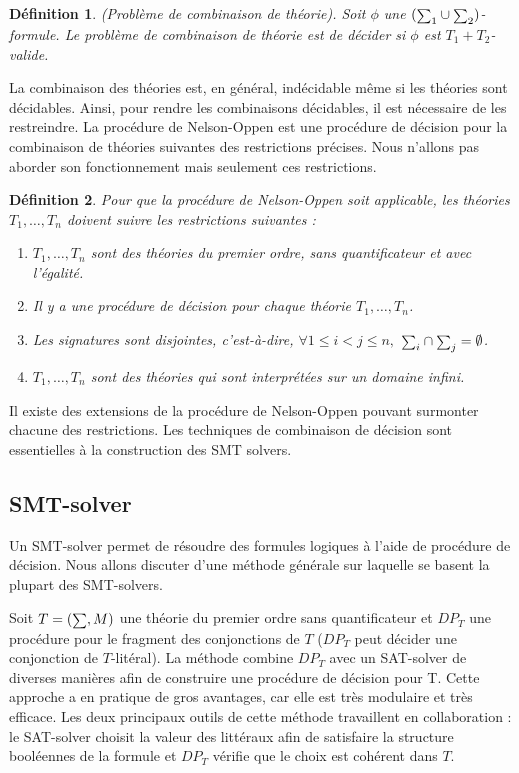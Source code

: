 \documentclass[11pt,openany]{article}
\newcommand\smallsum{\mathsmaller\sum}
\newtheorem{definition}{D\'efinition}[subsection]
\begin{document}
	\begin{definition}
	(Probl\`eme de combinaison de th\'eorie). Soit $\phi$ une $(\smallsum_{1}\cup\smallsum_{2})$-formule. Le probl\`eme de combinaison de th\'eorie est de d\'ecider si $\phi$ est $T_{1}+T_{2}$-valide.
	\end{definition}
	
	La combinaison des th\'eories est, en g\'en\'eral, ind\'ecidable m\^eme si les th\'eories sont d\'ecidables. Ainsi, pour rendre les combinaisons d\'ecidables, il est n\'ecessaire de les restreindre.	La proc\'edure de Nelson-Oppen est une proc\'edure de d\'ecision pour la combinaison de th\'eories suivantes des restrictions pr\'ecises. Nous n'allons pas aborder son fonctionnement mais seulement ces restrictions.
	\begin{definition}
		Pour que la proc\'edure de Nelson-Oppen soit applicable, les th\'eories $T_{1},\ldots,T_{n}$ doivent suivre les restrictions suivantes :
		\begin{enumerate}
		\item $T_{1},\ldots,T_{n}$ sont des th\'eories du premier ordre, sans quantificateur et avec l'\'egalit\'e.
		\item Il y a une proc\'edure de d\'ecision pour chaque th\'eorie $T_{1},\ldots,T_{n}$.
		\item Les signatures sont disjointes, c'est-\`a-dire, $\forall 1\leq i<j\leq n,$ $\smallsum_{i}\cap\smallsum_{j}=\emptyset$.
		\item $T_{1},\ldots,T_{n}$ sont des th\'eories qui sont interpr\'et\'ees sur un domaine infini.
		\end{enumerate}
	\end{definition}
	Il existe des extensions de la proc\'edure de Nelson-Oppen pouvant surmonter chacune des restrictions. Les techniques de combinaison de d\'ecision sont essentielles \`a la construction des SMT solvers.

 	\subsection{SMT-solver}
	 		Un SMT-solver permet de r\'esoudre des formules logiques \`a l'aide de proc\'edure de d\'ecision. Nous allons discuter d'une m\'ethode g\'en\'erale sur laquelle se basent la plupart des SMT-solvers.
	 		
	 		 Soit $T=(\smallsum,M)$ une th\'eorie du premier ordre sans quantificateur et $DP_{T}$ une proc\'edure pour le fragment des conjonctions de $T$ ($DP_{T}$ peut d\'ecider une conjonction de $T$-lit\'eral). La m\'ethode combine $DP_{T}$ avec un SAT-solver  de diverses mani\`eres afin de construire une proc\'edure de d\'ecision pour T. Cette approche a en pratique de gros avantages, car elle est tr\`es modulaire et tr\`es efficace. Les deux principaux outils de cette m\'ethode travaillent en collaboration : le SAT-solver choisit la valeur des litt\'eraux afin de satisfaire la structure bool\'eennes de la formule et $DP_{T}$ v\'erifie que le choix est coh\'erent dans $T$.
	 		 
\end{document}
